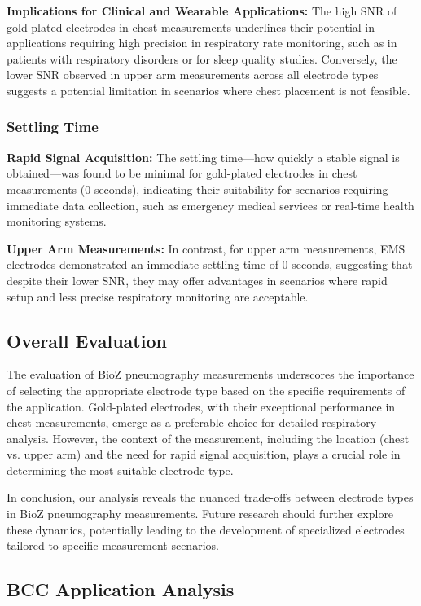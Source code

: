 \documentclass[conference]{IEEEtran}
\begin{document}
\textbf{Implications for Clinical and Wearable Applications:} The high SNR of gold-plated electrodes in chest measurements underlines their potential in applications requiring high precision in respiratory rate monitoring, such as in patients with respiratory disorders or for sleep quality studies. Conversely, the lower SNR observed in upper arm measurements across all electrode types suggests a potential limitation in scenarios where chest placement is not feasible.

\subsubsection{Settling Time}

\textbf{Rapid Signal Acquisition:} The settling time—how quickly a stable signal is obtained—was found to be minimal for gold-plated electrodes in chest measurements (0 seconds), indicating their suitability for scenarios requiring immediate data collection, such as emergency medical services or real-time health monitoring systems.

\textbf{Upper Arm Measurements:} In contrast, for upper arm measurements, EMS electrodes demonstrated an immediate settling time of 0 seconds, suggesting that despite their lower SNR, they may offer advantages in scenarios where rapid setup and less precise respiratory monitoring are acceptable.

\subsection{Overall Evaluation}

The evaluation of BioZ pneumography measurements underscores the importance of selecting the appropriate electrode type based on the specific requirements of the application. Gold-plated electrodes, with their exceptional performance in chest measurements, emerge as a preferable choice for detailed respiratory analysis. However, the context of the measurement, including the location (chest vs. upper arm) and the need for rapid signal acquisition, plays a crucial role in determining the most suitable electrode type.

In conclusion, our analysis reveals the nuanced trade-offs between electrode types in BioZ pneumography measurements. Future research should further explore these dynamics, potentially leading to the development of specialized electrodes tailored to specific measurement scenarios.

\subsection{BCC Application Analysis}
\end{document}

